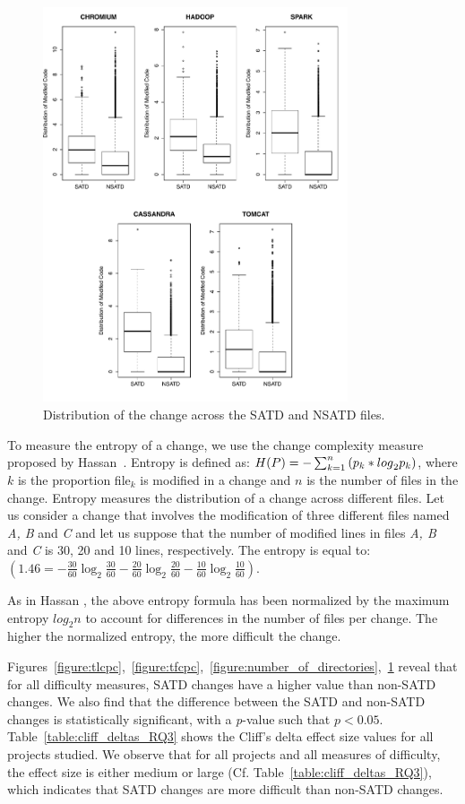 \begin{figure}[h]
	\centering
	\includegraphics[width=90mm]{figures/chapter3/entropy_for_all_projects}
	\caption{Distribution of the change across the SATD and NSATD files.}
	\label{figure:mtdocatdf}
\end{figure}


To measure the entropy of a change, we use the change complexity measure proposed by Hassan~\cite{hassan2009predicting}. Entropy is defined as: $H(P)=-\sum _{k=1}^{n}\textrm ({p}_{k}*{log}_{2} {p}_{k})$, where $k$ is the proportion file$_{k}$ is modified in a change and $n$ is the number of files in the change. Entropy measures the distribution of a change across different files. Let us consider a change that involves the modification of three different files named \textit{A, B} and \textit{C} and let us suppose that the number of modified lines in files\textit{ A, B} and \textit{C} is 30, 20 and 10 lines, respectively. The entropy is equal to:
$(1.46=-\frac{30}{60}\log_{2}\frac{30}{60}-\frac{20}{60}\log_{2}\frac{20}{60}-\frac{10}{60}\log_{2}\frac{10}{60})$.

As in Hassan \cite{hassan2009predicting}, the above entropy formula has been normalized by the maximum entropy $log_{2}n$ to account for differences in the number of files per change. The higher the normalized entropy, the more difficult the change.




 Figures~\ref{figure:tlcpc},~\ref{figure:tfcpc},~\ref{figure:number_of_directories},~\ref{figure:mtdocatdf} reveal that for all difficulty measures, SATD changes have a higher value than non-SATD changes. We also find that the difference between the SATD and non-SATD changes is statistically significant, with a \textit{p}-value such that $p < 0.05$. Table~\ref{table:cliff_deltas_RQ3} shows the Cliff's delta effect size values for all projects studied. We observe that for all projects and all measures of difficulty, the effect size is either medium or large (Cf. Table~\ref{table:cliff_deltas_RQ3}), which indicates that SATD changes are more difficult than non-SATD changes.

